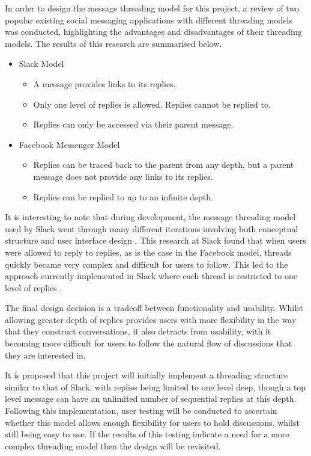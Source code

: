 In order to design the message threading model for this project, a review of two popular existing social messaging applications with different threading models was conducted, highlighting the advantages and disadvantages of their threading models. The results of this research are summarised below.

\begin{itemize}
  \item Slack Model \cite{slack}
    \begin{itemize}
      \item A message provides links to its replies.
      \item Only one level of replies is allowed. Replies cannot be replied to.
      \item Replies can only be accessed via their parent message.
    \end{itemize}
  \item Facebook Messenger Model \cite{fb-messenger}
    \begin{itemize}
      \item Replies can be traced back to the parent from any depth, but a parent message does not provide any links to its replies.
      \item Replies can be replied to up to an infinite depth.
    \end{itemize}
\end{itemize}

It is interesting to note that during development, the message threading model used by Slack went through many different iterations involving both conceptual structure and user interface design \cite{florin2018}. This research at Slack found that when users were allowed to reply to replies, as is the case in the Facebook model, threads quickly became very complex and difficult for users to follow. This led to the approach currently implemented in Slack where each thread is restricted to one level of replies \cite{florin2018}.

The final design decision is a tradeoff between functionality and usability. Whilst allowing greater depth of replies provides users with more flexibility in the way that they construct conversations, it also detracts from usability, with it becoming more difficult for users to follow the natural flow of discussions that they are interested in. 

It is proposed that this project will initially implement a threading structure similar to that of Slack, with replies being limited to one level deep, though a top level message can have an unlimited number of sequential replies at this depth. Following this implementation, user testing will be conducted to ascertain whether this model allows enough flexibility for users to hold discussions, whilst still being easy to use. If the results of this testing indicate a need for a more complex threading model then the design will be revisited.


